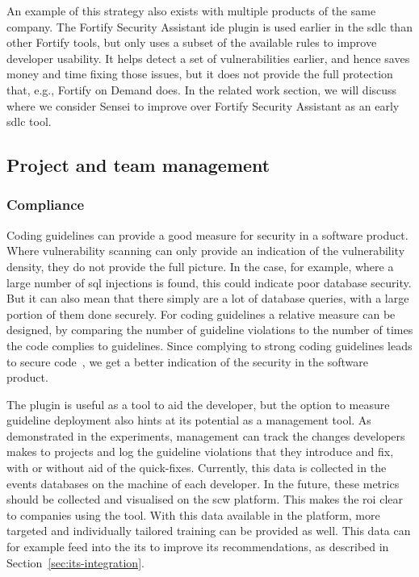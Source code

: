 An example of this strategy also exists with multiple products of the same company. 
The Fortify Security Assistant \gls{ide} plugin is used earlier in the \gls{sdlc} than other Fortify tools, but only uses a subset of the available rules to improve developer usability.
It helps detect a set of vulnerabilities earlier, and hence saves money and time fixing those issues, but it does not provide the full protection that, e.g., Fortify on Demand does.
In the related work section, we will discuss where we consider Sensei to improve over Fortify Security Assistant as an early \gls{sdlc} tool.

\subsection{Project and team management}
\subsubsection{Compliance}
Coding guidelines can provide a good measure for security in a software product.
Where vulnerability scanning can only provide an indication of the vulnerability density, they do not provide the full picture.
In the case, for example, where a large number of \gls{sql} injections is found, this could indicate poor database security.
But it can also mean that there simply are a lot of database queries, with a large portion of them done securely.
For coding guidelines a relative measure can be designed, by comparing the number of guideline violations to the number of times the code complies to guidelines. Since complying to strong coding guidelines leads to secure code~\cite{banerjee2009software,tabassum2017comparing}, we get a better indication of the security in the software product.

The plugin is useful as a tool to aid the developer, but the option to measure guideline deployment also hints at its potential as a management tool.
As demonstrated in the experiments, management can track the changes developers makes to projects and log the guideline violations that they introduce and fix, with or without aid of the quick-fixes.
Currently, this data is collected in the events databases on the machine of each developer.
In the future, these metrics should be collected and visualised on the \gls{scw} platform.
This makes the \gls{roi} clear to companies using the tool.
With this data available in the platform, more targeted and individually tailored training can be provided as well.
This data can for example feed into the \gls{its} to improve its recommendations, as described in Section~\ref{sec:its-integration}.

